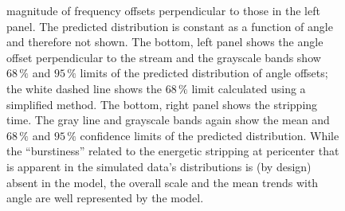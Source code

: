\documentclass[12pt,preprint]{aastex}
\begin{document}
\begin{figure}[t!]
{    magnitude of frequency offsets perpendicular to those in the left
    panel. The predicted distribution is constant as a function of
    angle and therefore not shown. The bottom, left panel shows the
    angle offset perpendicular to the stream and the grayscale bands
    show $68\,\%$ and $95\,\%$ limits of the predicted distribution of
    angle offsets; the white dashed line shows the $68\,\%$ limit
    calculated using a simplified method. The bottom, right panel
    shows the stripping time. The gray line and grayscale bands again
    show the mean and $68\,\%$ and $95\,\%$ confidence limits of the
    predicted distribution. While the ``burstiness'' related to the
    energetic stripping at pericenter that is apparent in the
    simulated data's distributions is (by design) absent in the model,
    the overall scale and the mean trends with angle are well
    represented by the model.}\label{fig:gd1_apar}
\end{figure}
\end{document}
